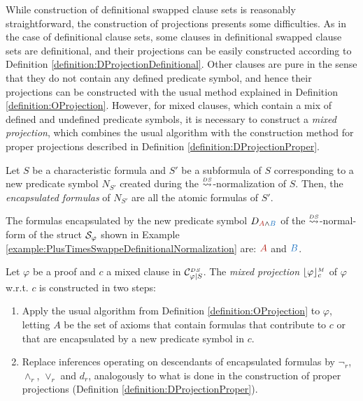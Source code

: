 \noindent 
While construction of definitional swapped clause sets is reasonably
straightforward, the construction of projections presents some difficulties.
As in the case of definitional clause sets, some clauses in definitional
swapped clause sets are definitional, and their projections can be easily
constructed according to Definition \ref{definition:DProjectionDefinitional}.
Other clauses are pure in the sense that they do not contain any defined
predicate symbol, and hence their projections can be constructed with the
usual method explained in Definition \ref{definition:OProjection}. However,
for mixed clauses, which contain a mix of defined and undefined predicate
symbols, it is necessary to construct a \emph{mixed projection}, which
combines the usual algorithm with the construction method for proper 
projections described in Definition \ref{definition:DProjectionProper}.



\begin{definition}
\label{definition:EncapsulatedFormulaOccurrences} Let $S$ be a characteristic
formula and $S'$ be a subformula of $S$ corresponding to a new predicate
symbol $N_{S'}$ created during the $\normalizePlusTimesSD$-normalization of
$S$. Then, the \emph{encapsulated formulas} of $N_{S'}$ are all the atomic
formulas of $S'$. 
\end{definition}

\begin{example} 
\label{example:EncapsulatedFormulaOccurrences} 
The formulas encapsulated by the new predicate symbol 
$D_{\hA{A} \structplus \hB{B}}$ of the $\normalizePlusTimesSD$-normal-form 
of the struct $\mathcal{S}_{\varphi}$ shown
in Example \ref{example:PlusTimesSwappeDefinitionalNormalization} are:
$\hA{A}$ and $\hB{B}$. 
\hfill\QED 
\end{example}


\begin{definition}
\label{definition:DWProjectionMixed}
Let $\varphi$ be a proof and $c$ a mixed clause in $\clausesetSwapDef{\varphi}{S}$.
The \emph{mixed projection} $\projectionMixed{\varphi}{c}$ of $\varphi$ w.r.t. $c$ is constructed in two steps:
\begin{enumerate}
\item Apply the usual algorithm from Definition \ref{definition:OProjection} to $\varphi$, letting $A$ be the set of axioms that contain formulas that contribute to $c$ or that are encapsulated by a new predicate symbol in $c$.
%
\item Replace inferences operating on descendants of encapsulated formulas by $\neg_r$, $\wedge_r$, $\vee_r$ and $d_r$, analogously to what is done in the construction of proper projections (Definition \ref{definition:DProjectionProper}).
\end{enumerate}
\end{definition}


